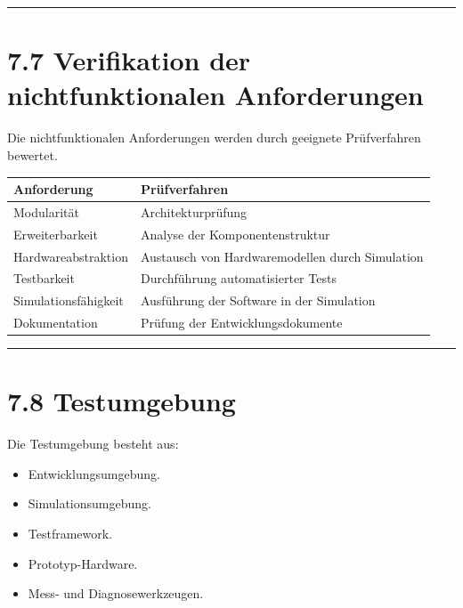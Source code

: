 \documentclass[
]{article}
\providecommand{\tightlist}{%
  \setlength{\itemsep}{0pt}\setlength{\parskip}{0pt}}
\begin{document}
\begin{center}\rule{0.5\linewidth}{0.5pt}\end{center}

\section{7.7 Verifikation der nichtfunktionalen
Anforderungen}\label{verifikation-der-nichtfunktionalen-anforderungen}

Die nichtfunktionalen Anforderungen werden durch geeignete Prüfverfahren
bewertet.

\begin{longtable}[]{@{}
  >{\raggedright\arraybackslash}p{}
  >{\raggedright\arraybackslash}p{}@{}}
\toprule\noalign{}
\begin{minipage}[b]{\linewidth}\raggedright
Anforderung
\end{minipage} & \begin{minipage}[b]{\linewidth}\raggedright
Prüfverfahren
\end{minipage} \\
\midrule\noalign{}
\endhead
\bottomrule\noalign{}
\endlastfoot
Modularität & Architekturprüfung \\
Erweiterbarkeit & Analyse der Komponentenstruktur \\
Hardwareabstraktion & Austausch von Hardwaremodellen durch Simulation \\
Testbarkeit & Durchführung automatisierter Tests \\
Simulationsfähigkeit & Ausführung der Software in der Simulation \\
Dokumentation & Prüfung der Entwicklungsdokumente \\
\end{longtable}

\begin{center}\rule{0.5\linewidth}{0.5pt}\end{center}

\section{7.8 Testumgebung}\label{testumgebung}

Die Testumgebung besteht aus:

\begin{itemize}
\tightlist
\item
  Entwicklungsumgebung.
\item
  Simulationsumgebung.
\item
  Testframework.
\item
  Prototyp-Hardware.
\item
  Mess- und Diagnosewerkzeugen.
\end{itemize}
\end{document}

